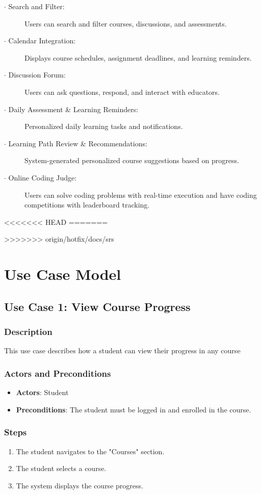 \documentclass[a4paper, 11pt]{scrreprt}
\begin{document}
\begin{description}
\begin{enumerate}
        \end{enumerate}
    \item[$\cdot$ Search and Filter:] Users can search and filter courses, discussions, and assessments.
    \item[$\cdot$ Calendar Integration:] Displays course schedules, assignment deadlines, and learning reminders.
    \item[$\cdot$ Discussion Forum:] Users can ask questions, respond, and interact with educators.
    \item[$\cdot$ Daily Assessment \& Learning Reminders:] Personalized daily learning tasks and notifications.
    \item[$\cdot$ Learning Path Review \& Recommendations:] System-generated personalized course suggestions based on progress.
    \item[$\cdot$ Online Coding Judge:] Users can solve coding problems with real-time execution and have coding competitions with leaderboard tracking.
\end{description}
<<<<<<< HEAD
=======

>>>>>>> origin/hotfix/docs/srs
\section{Use Case Model}

\subsection{Use Case 1: View Course Progress}
\subsubsection{Description}
This use case describes how a student can view their progress in any course

\subsubsection{Actors and Preconditions}
\begin{itemize}
    \item \textbf{Actors}: Student
    \item \textbf{Preconditions}: The student must be logged in and enrolled in the course.
\end{itemize}

\subsubsection{Steps}
\begin{enumerate}
    \item The student navigates to the "Courses" section.
    \item The student selects a course.
    \item The system displays the course progress.
\end{enumerate}
\end{document}
